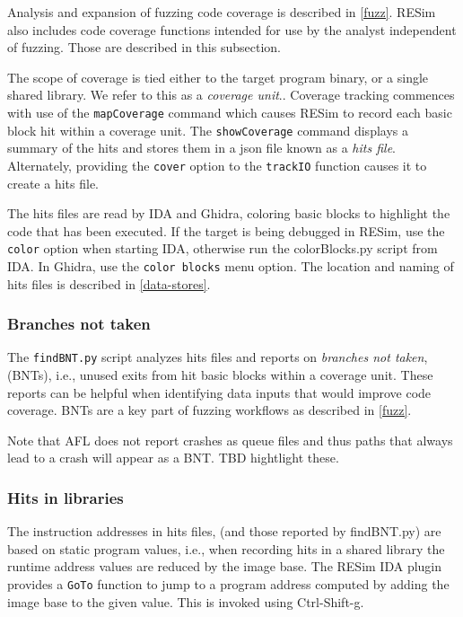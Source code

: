 \documentclass[titlepage]{article}
\begin{document}
Analysis and expansion of fuzzing code coverage is described in \ref{fuzz}.  RESim also includes code coverage functions intended for use
by the analyst independent of fuzzing.  Those are described in this subsection.  

The scope of coverage is tied either to the target program binary, or a single shared library.  We refer to this as a \textit{coverage unit}..  
Coverage tracking commences with use of the {\tt mapCoverage} command which causes RESim to record each basic block hit within a coverage unit.
The {\tt showCoverage} command displays a summary of the hits and stores them in a json file known as a \textit {hits file}.  
Alternately, providing the {\tt cover} option to the {\tt trackIO} function causes it to create a hits file.

The hits files are read by IDA and Ghidra, coloring basic blocks to highlight the code that has been executed. If the target is being debugged in RESim,
use the {\tt color} option when starting IDA, otherwise run the colorBlocks.py script from IDA.  In Ghidra, use the {\tt color blocks} menu option.
The location and naming of hits files is described in \ref{data-stores}.

\subsubsection{Branches not taken}
The {\tt findBNT.py} script analyzes hits files and reports on \textit{branches not taken}, (BNTs), i.e., unused exits from hit basic blocks within a coverage unit.
These reports can be helpful when identifying data inputs that would improve code coverage.  BNTs are a key part of fuzzing workflows as described in \ref{fuzz}.

Note that AFL does not report crashes as queue files and thus paths that always lead to a crash will appear as a BNT.  TBD hightlight these.

\subsubsection{Hits in libraries}
The instruction addresses in hits files, (and those reported by findBNT.py) are based on static program values, i.e., when recording hits 
in a shared library the runtime address values are reduced by the image base. 
The RESim IDA plugin provides a {\tt GoTo} function to jump to a program address computed by adding the image base to the given value.  This is invoked using Ctrl-Shift-g.
\end{document}
